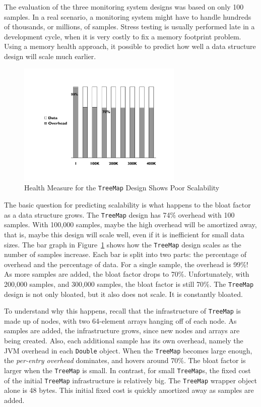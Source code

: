 \documentclass{book}
\theoremstyle{definition}
\begin{document}
The evaluation of the three monitoring system designs was based on only 100 samples. In a real scenario, a monitoring system might have to handle hundreds of thousands, or millions, of samples. Stress testing is usually performed late in a development cycle, when it is very costly to fix a memory footprint problem. Using a memory health approach, it possible to predict how well a data structure design will scale much earlier.
 
\begin{figure}
  \centering
  \includegraphics[width=0.7\textwidth]{Figures/chapter3/scalable-health-treemap}
  \caption{Health Measure for the \texttt{TreeMap} Design Shows Poor Scalability}
  \label{fig:scalable-health-treemap}
\end{figure}
The basic question for predicting scalability is what happens to the bloat factor as a data structure grows. The \texttt{TreeMap} design has 74\% overhead with 100 samples. With 100,000 samples, maybe the high overhead will be amortized away, that is, maybe this design will scale well, even if it is inefficient for small data sizes. The bar graph in Figure~\ref{fig:scalable-health-treemap} shows how the \texttt{TreeMap} design scales as the number of samples increase. Each bar is split into two parts: the percentage of overhead and the percentage of data. For a single sample, the overhead is 99\%! As more samples are added, the bloat factor drops to 70\%. Unfortunately, with 200,000 samples, and 300,000 samples, the bloat factor is still 70\%. The \texttt{TreeMap} design is not only bloated, but it also does not scale. It is constantly bloated.

To understand why this happens, recall that the infrastructure of \texttt{TreeMap} is made up of nodes, with two 64-element arrays hanging off of each node. As samples are added, the infrastructure grows, since new nodes and arrays are being created. Also, each additional sample has its own overhead, namely the JVM overhead in each \texttt{Double} object. When the \texttt{TreeMap} becomes large enough, the \textit{per-entry overhead} dominates, and hovers around 70\%. The bloat factor is larger when the \texttt{TreeMap} is small. In contrast, for small \texttt{TreeMap}s, the fixed cost of the initial \texttt{TreeMap} infrastructure is relatively big. The \texttt{TreeMap} wrapper object alone is 48 bytes. This initial fixed cost is quickly amortized away as samples are added. 
\end{document}
